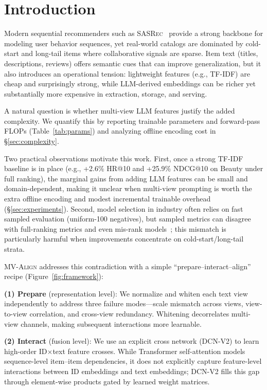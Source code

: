 \documentclass[sigconf,natbib=true,anonymous]{acmart}
\newcommand{\model}{\textsc{MV-Align}\xspace}
\newcommand{\base}{\textsc{SASRec}\xspace}
\newcommand{\tfidf}{\textsc{TF-IDF}\xspace}
\newcommand{\llm}{\textsc{LLM}\xspace}
\begin{document}
\section{Introduction}

Modern sequential recommenders such as \base~\cite{kang2018sasrec}
provide a strong backbone for modeling user behavior sequences,
yet real-world catalogs are dominated by cold-start and long-tail
items where collaborative signals are sparse. Item text (titles,
descriptions, reviews) offers semantic cues that can improve
generalization, but it also introduces an operational tension:
lightweight features (e.g., \tfidf) are cheap and surprisingly
strong, while \llm-derived embeddings can be richer yet
substantially more expensive in extraction, storage, and serving.

A natural question is whether multi-view \llm features justify
the added complexity. We quantify this by reporting trainable
parameters and forward-pass FLOPs (Table~\ref{tab:params}) and
analyzing offline encoding cost in \S\ref{sec:complexity}.

Two practical observations motivate this work. First, once a
strong \tfidf baseline is in place (e.g., +2.6\% HR@10 and
+25.9\% NDCG@10 on Beauty under full ranking), the marginal
gains from adding \llm features can be small and domain-dependent,
making it unclear when multi-view prompting is worth the extra
offline encoding and modest incremental trainable overhead
(\S\ref{sec:experiments}). Second, model selection in industry often relies on fast
sampled evaluation (uniform-100 negatives), but
sampled metrics can disagree with full-ranking metrics and even
mis-rank models~\cite{krichene2020sampledmetrics}; this mismatch
is particularly harmful when improvements concentrate on
cold-start/long-tail strata.

\model addresses this contradiction with a simple
``prepare--interact--align'' recipe (Figure~\ref{fig:framework}):

\textbf{(1) Prepare} (representation level): We normalize
and whiten each text view independently to address three failure
modes---scale mismatch across views, view-to-view correlation,
and cross-view redundancy. Whitening decorrelates multi-view
channels, making subsequent interactions more learnable.

\textbf{(2) Interact} (fusion level): We use an explicit cross
network (DCN-V2) to learn high-order ID$\times$text feature
crosses. While Transformer self-attention models sequence-level
item--item dependencies, it does not explicitly capture
feature-level interactions between ID embeddings and text
embeddings; DCN-V2 fills this gap through element-wise products
gated by learned weight matrices.
\end{document}
